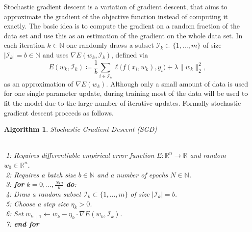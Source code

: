 \documentclass[11pt, a4paper]{article}
\newtheorem{algorithm}[theorem]{Algorithm}
\newcommand{\N}{\mathbb{N}}
\newcommand{\R}{\mathbb{R}}
\newcommand{\I}{\mathcal{I}}
\begin{document}

Stochastic gradient descent is a variation of gradient descent, that aims to approximate the gradient of the objective function instead of computing it exactly. The basic idea is to compute the gradient on a random fraction of the data set and use this as an estimation of the gradient on the whole data set. In each iteration $k \in \N$ one randomly draws a subset $\I_k \subset \{ 1, \dots, m \}$ of size $| \I_k | = b \in \N$ and uses $\nabla E(w_k,\I_k)$, defined via
\[ E(w_k,\I_k) \coloneq \frac{1}{b} \sum_{i \in \I_k}^{} \ell \big ( f(x_i,w_k),y_i \big) + \lambda \big \| w_k \big \|_2^2, \]
as an approximation of $\nabla E(w_k)$. Although only a small amount of data is used for one single parameter update, during training most of the data will be used to fit the model due to the large number of iterative updates. Formally stochastic gradient descent proceeds as follows.

\begin{algorithm} 
\caption{Stochastic Gradient Descent (SGD) \textcolor{white}{$\Big |$}} \ \\
\textcolor{white}{$\Big |$}1: Requires differentiable empirical error function $E: \R^n \to \R$ and random $w_0 \in \R^n$. \\
\textcolor{white}{$\Big |$}2: Requires a batch size $b \in \N$ and a number of epochs $N \in \N$. \\
\textcolor{white}{$\Big |$}3: \textbf{for} $k=0, \dots, \frac{Nm}{b}$ \textbf{do}: \\
\textcolor{white}{$\Big |$}4: \quad Draw a random subset $\I_k \subset \{1, \dots, m \}$ of size $| \I_k | = b$. \\
\textcolor{white}{$\Big |$}5: \quad Choose a step size $\eta_k > 0$. \\
\textcolor{white}{$\Big |$}6: \quad Set $w_{k+1} \leftarrow w_k - \eta_k \cdot \nabla E(w_k,\I_k)$. \\
\textcolor{white}{$\Big |$}7: \textbf{end for}
\end{algorithm}
\end{document}
